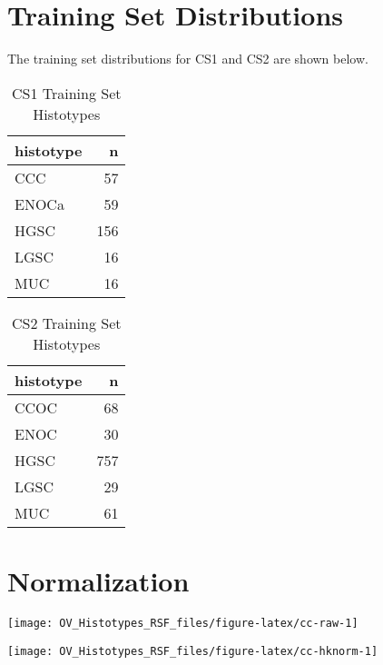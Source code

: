 \documentclass[
]{report}
\begin{document}
\hypertarget{training-set-distributions}{%
\section{Training Set Distributions}\label{training-set-distributions}}

The training set distributions for CS1 and CS2 are shown below.

\begin{table}

\caption{\label{tab:training-dist-cs1}CS1 Training Set Histotypes}
\centering
\begin{tabular}[t]{l|r}
\hline
histotype & n\\
\hline
CCC & 57\\
\hline
ENOCa & 59\\
\hline
HGSC & 156\\
\hline
LGSC & 16\\
\hline
MUC & 16\\
\hline
\end{tabular}
\end{table}

\begin{table}

\caption{\label{tab:training-dist-cs2}CS2 Training Set Histotypes}
\centering
\begin{tabular}[t]{l|r}
\hline
histotype & n\\
\hline
CCOC & 68\\
\hline
ENOC & 30\\
\hline
HGSC & 757\\
\hline
LGSC & 29\\
\hline
MUC & 61\\
\hline
\end{tabular}
\end{table}

\hypertarget{normalization}{%
\section{Normalization}\label{normalization}}

\begin{center}\texttt{[image: OV\_Histotypes\_RSF\_files/figure-latex/cc-raw-1]} \end{center}

\begin{center}\texttt{[image: OV\_Histotypes\_RSF\_files/figure-latex/cc-hknorm-1]} \end{center}
\end{document}
